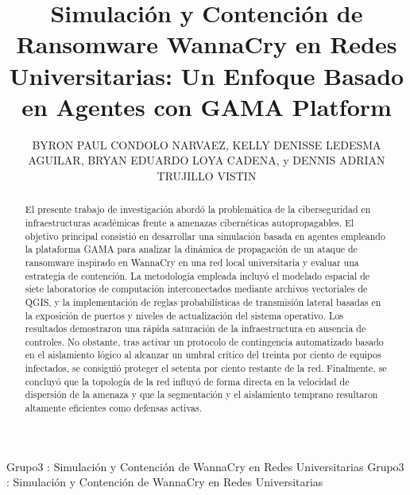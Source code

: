 \documentclass{ieeeaccess}
\begin{document}

\title{Simulación y Contención de Ransomware WannaCry en Redes Universitarias: Un Enfoque Basado en Agentes con GAMA Platform}

\author{\uppercase{Byron Paul Condolo Narvaez}, 
\uppercase{Kelly Denisse Ledesma Aguilar}, 
\uppercase{Bryan Eduardo Loya Cadena}, y 
\uppercase{Dennis Adrian Trujillo Vistin}}

\address[1]{Facultad de Ingeniería y Ciencias Aplicadas, Universidad Central del Ecuador, Quito 170521, Ecuador (e-mail: bpcondolo@uce.edu.ec, kdledesma@uce.edu.ec, beloya@uce.edu.ec, datrujillov@uce.edu.ec)}


\markboth
{Grupo3 \headeretal: Simulación y Contención de WannaCry en Redes Universitarias}
{Grupo3 \headeretal: Simulación y Contención de WannaCry en Redes Universitarias}


\begin{abstract}
El presente trabajo de investigación abordó la problemática de la ciberseguridad en infraestructuras académicas frente a amenazas cibernéticas autopropagables. El objetivo principal consistió en desarrollar una simulación basada en agentes empleando la plataforma GAMA para analizar la dinámica de propagación de un ataque de ransomware inspirado en WannaCry en una red local universitaria y evaluar una estrategia de contención. La metodología empleada incluyó el modelado espacial de siete laboratorios de computación interconectados mediante archivos vectoriales de QGIS, y la implementación de reglas probabilísticas de transmisión lateral basadas en la exposición de puertos y niveles de actualización del sistema operativo. Los resultados demostraron una rápida saturación de la infraestructura en ausencia de controles. No obstante, tras activar un protocolo de contingencia automatizado basado en el aislamiento lógico al alcanzar un umbral crítico del treinta por ciento de equipos infectados, se consiguió proteger el setenta por ciento restante de la red. Finalmente, se concluyó que la topología de la red influyó de forma directa en la velocidad de dispersión de la amenaza y que la segmentación y el aislamiento temprano resultaron altamente eficientes como defensas activas.
\end{abstract}
\end{document}
